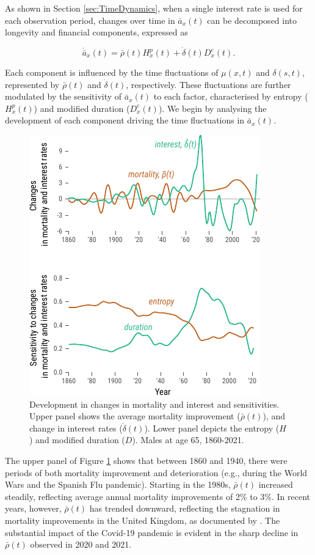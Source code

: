 \documentclass[12pt]{article}
\begin{document}
As shown in Section \ref{sec:TimeDynamics}, when a single interest rate is used for each observation period, changes over time in \( \bar{a}_x(t) \) can be decomposed into longevity and financial components, expressed as 

\[
\acute{\bar{a}}_x(t) = \bar{\rho}(t) {H}^{p}_x(t) + \dot{\delta}(t) D^{c}_x(t).
\]

Each component is influenced by the time fluctuations of \( \mu(x,t) \) and \( \delta(s,t) \), represented by \( \bar{\rho}(t) \) and \( \dot{\delta}(t) \), respectively. These fluctuations are further modulated by the sensitivity of \( \bar{a}_x(t) \) to each factor, characterised by entropy (\( {H}^{p}_x(t) \)) and modified duration (\( {D}^{c}_x(t) \)). We begin by analysing the development of each component driving the time fluctuations in \( \bar{a}_x(t) \).

\begin{figure}[H]
	\centering
	\includegraphics[width=0.5\linewidth]{Fig/changeMortalityInterestAndSensitivities}
	\caption{{Development in changes in mortality and interest and sensitivities. Upper panel shows the average mortality improvement ($\bar{\rho}(t)$), and change in interest rates ($\dot{\delta}(t)$). Lower panel depicts the entropy ($H$) and modified duration ($D$). Males at age 65, 1860-2021.}}
	\label{fig:Fig3}
\end{figure}


The upper panel of Figure \ref{fig:Fig3} shows that between 1860 and 1940, there were periods of both mortality improvement and deterioration (e.g., during the World Wars and the Spanish Flu pandemic). Starting in the 1980s, \( \bar{\rho}(t) \) increased steadily, reflecting average annual mortality improvements of 2\% to 3\%. In recent years, however, \( \bar{\rho}(t) \) has trended downward, reflecting the stagnation in mortality improvements in the United Kingdom, as documented by \citet{djeundje2022slowdown}. The substantial impact of the Covid-19 pandemic is evident in the sharp decline in \( \bar{\rho}(t) \) observed in 2020 and 2021.
\end{document}
